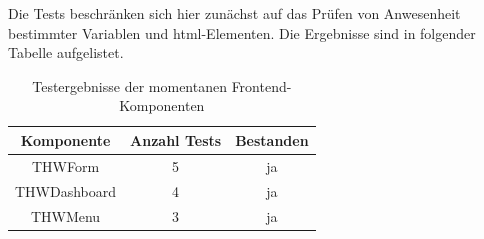\documentclass[a4paper,11pt,oneside, titlepage]{article}
\begin{document}
      Die Tests beschränken sich hier zunächst auf das Prüfen von Anwesenheit bestimmter Variablen und html-Elementen.
      Die Ergebnisse sind in folgender Tabelle aufgelistet.

      \begin{table}[htpb]
        \centering
        \label{tab:test}
        \begin{tabular}{c | c | c}
          Komponente & Anzahl Tests & Bestanden \\
          \hline
          THWForm & 5 & ja \\
          THWDashboard & 4 & ja \\
          THWMenu & 3 & ja 
        \end{tabular}
        \caption{Testergebnisse der momentanen Frontend-Komponenten}
      \end{table}

      \newpage

      
      \printglossaries
  
\end{document}
